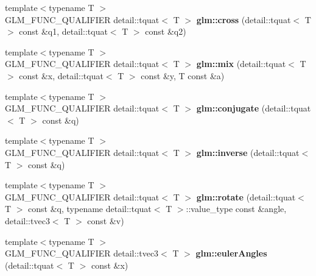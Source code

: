 \begin{DoxyCompactItemize}
\item 
\hypertarget{namespaceglm_aa097c896b3eae629723dd87304e3f061}{{\footnotesize template$<$typename T $>$ }\\\-G\-L\-M\-\_\-\-F\-U\-N\-C\-\_\-\-Q\-U\-A\-L\-I\-F\-I\-E\-R \*
detail\-::tquat$<$ \-T $>$ {\bfseries glm\-::cross} (detail\-::tquat$<$ \-T $>$ const \&q1, detail\-::tquat$<$ \-T $>$ const \&q2)}\label{namespaceglm_aa097c896b3eae629723dd87304e3f061}

\item 
\hypertarget{namespaceglm_a2f168eb44d67eab62bacf1726a422f34}{{\footnotesize template$<$typename T $>$ }\\\-G\-L\-M\-\_\-\-F\-U\-N\-C\-\_\-\-Q\-U\-A\-L\-I\-F\-I\-E\-R \*
detail\-::tquat$<$ \-T $>$ {\bfseries glm\-::mix} (detail\-::tquat$<$ \-T $>$ const \&x, detail\-::tquat$<$ \-T $>$ const \&y, \-T const \&a)}\label{namespaceglm_a2f168eb44d67eab62bacf1726a422f34}

\item 
\hypertarget{namespaceglm_ace65ce2d1d77bf12330b35172fd1353b}{{\footnotesize template$<$typename T $>$ }\\\-G\-L\-M\-\_\-\-F\-U\-N\-C\-\_\-\-Q\-U\-A\-L\-I\-F\-I\-E\-R \*
detail\-::tquat$<$ \-T $>$ {\bfseries glm\-::conjugate} (detail\-::tquat$<$ \-T $>$ const \&q)}\label{namespaceglm_ace65ce2d1d77bf12330b35172fd1353b}

\item 
\hypertarget{namespaceglm_a8efed23140ce4dece43c1ea52df962f6}{{\footnotesize template$<$typename T $>$ }\\\-G\-L\-M\-\_\-\-F\-U\-N\-C\-\_\-\-Q\-U\-A\-L\-I\-F\-I\-E\-R \*
detail\-::tquat$<$ \-T $>$ {\bfseries glm\-::inverse} (detail\-::tquat$<$ \-T $>$ const \&q)}\label{namespaceglm_a8efed23140ce4dece43c1ea52df962f6}

\item 
\hypertarget{namespaceglm_a5ea424242db7a84723a1ba0222f85cb3}{{\footnotesize template$<$typename T $>$ }\\\-G\-L\-M\-\_\-\-F\-U\-N\-C\-\_\-\-Q\-U\-A\-L\-I\-F\-I\-E\-R \*
detail\-::tquat$<$ \-T $>$ {\bfseries glm\-::rotate} (detail\-::tquat$<$ \-T $>$ const \&q, typename detail\-::tquat$<$ \-T $>$\-::value\-\_\-type const \&angle, detail\-::tvec3$<$ \-T $>$ const \&v)}\label{namespaceglm_a5ea424242db7a84723a1ba0222f85cb3}

\item 
\hypertarget{namespaceglm_a1ce5e6658ac0af2575a9a3c8f3720f8f}{{\footnotesize template$<$typename T $>$ }\\\-G\-L\-M\-\_\-\-F\-U\-N\-C\-\_\-\-Q\-U\-A\-L\-I\-F\-I\-E\-R \*
detail\-::tvec3$<$ \-T $>$ {\bfseries glm\-::euler\-Angles} (detail\-::tquat$<$ \-T $>$ const \&x)}\label{namespaceglm_a1ce5e6658ac0af2575a9a3c8f3720f8f}


\end{DoxyCompactItemize}
